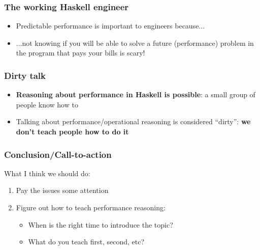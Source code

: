 \documentclass[xetex,mathserif,serif]{beamer}
\begin{document}
\begin{frame}
  \frametitle{The working Haskell engineer}
  \begin{itemize}
  \item Predictable performance is important to engineers because...
  \item ...not knowing if you will be able to solve a future
    (performance) problem in the program that pays your bills is
    scary!
  \end{itemize}
\end{frame}

\begin{frame}
  \frametitle{Dirty talk}
  \begin{itemize}
  \item \textbf{Reasoning about performance in Haskell is possible}: a
    small group of people know how to
  \item Talking about performance/operational reasoning is considered
    ``dirty'': \textbf{we don't teach people how to do it}
  \end{itemize}
\end{frame}

\begin{frame}
  \frametitle{Conclusion/Call-to-action}
  What I think we should do:
  \begin{enumerate}
  \item Pay the issues some attention
  \item Figure out how to teach performance reasoning:
    \begin{itemize}
    \item When is the right time to introduce the topic?
    \item What do you teach first, second, etc?
    \end{itemize}
  \end{enumerate}
\end{frame}
\end{document}
